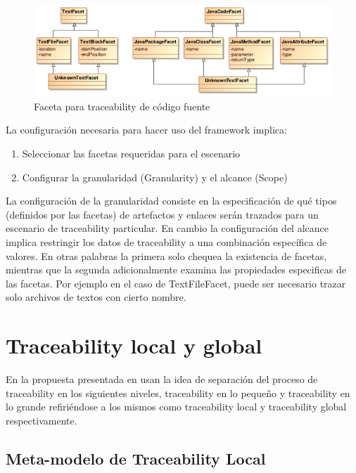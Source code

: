 \documentclass[a4paper,12pt,oneside]{book}
\begin{document}
\begin{figure}[hbtp]
\centering
\includegraphics[scale=.72]{./img/Faceta}
\caption{Faceta para traceability de código fuente}
\label{fig:FacetaCodigoFuente}
\end{figure}

La configuración necesaria para hacer uso del framework implica:

\begin{enumerate}
\item    Seleccionar las facetas requeridas para el escenario
\item    Configurar la granularidad (Granularity) y el alcance (Scope)
\end{enumerate}

La configuración de la granularidad consiste en la especificación de qué tipos (definidos por las facetas) de artefactos y enlaces serán trazados para un escenario de traceability particular. En cambio la configuración del alcance implica restringir los datos de traceability a una combinación específica de valores. En otras palabras la primera solo chequea la existencia de facetas, mientras que la segunda adicionalmente examina las propiedades especificas de las facetas. Por ejemplo en el caso de TextFileFacet, puede ser necesario trazar solo archivos de textos con cierto nombre.

\section{Traceability local y global}

En la propuesta presentada en \cite{GlitiaEtienDumoulin} usan la idea de separación del proceso de traceability en los siguientes niveles, traceability en lo pequeño y traceability en lo grande refiriéndose a los mismos como traceability local y traceability global respectivamente.

\subsection{Meta-modelo de Traceability Local}
\end{document}
